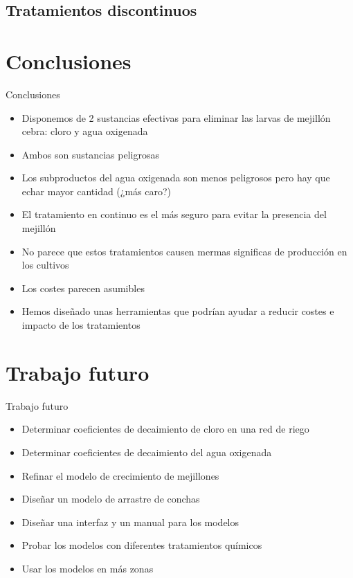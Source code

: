 \documentclass[pdr]{beamer}
\begin{document}
\subsection{Tratamientos discontinuos}

\section{Conclusiones}

\begin{frame}{Conclusiones}
	\begin{itemize}
		\item Disponemos de 2 sustancias efectivas para eliminar las
			larvas de mejillón cebra: cloro y agua oxigenada
		\item Ambos son sustancias peligrosas
		\item Los subproductos del agua oxigenada son menos peligrosos
			pero hay que echar mayor cantidad (¿más caro?)
		\item El tratamiento en continuo es el más seguro para evitar la
			presencia del mejillón
		\item No parece que estos tratamientos causen mermas
			significas de producción en los cultivos
		\item Los costes parecen asumibles
		\item Hemos diseñado unas herramientas que podrían ayudar a
			reducir costes e impacto de los tratamientos
	\end{itemize}
\end{frame}

\section{Trabajo futuro}

\begin{frame}{Trabajo futuro}
	\begin{itemize}
		\item Determinar coeficientes de decaimiento de cloro en una red
			de riego
		\item Determinar coeficientes de decaimiento del agua oxigenada
		\item Refinar el modelo de crecimiento de mejillones
		\item Diseñar un modelo de arrastre de conchas
		\item Diseñar una interfaz y un manual para los modelos
		\item Probar los modelos con diferentes tratamientos químicos
		\item Usar los modelos en más zonas
	\end{itemize}
\end{frame}
\end{document}
